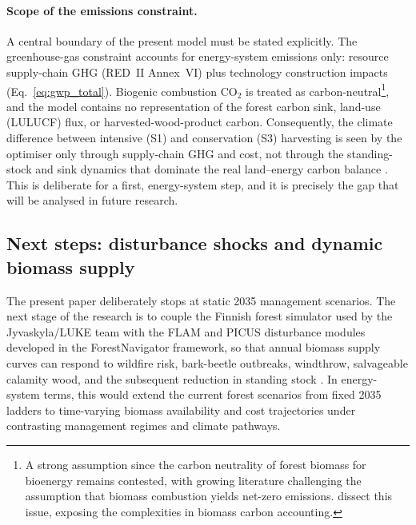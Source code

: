 \documentclass{article}
\begin{document}
\paragraph{Scope of the emissions constraint.}
A central boundary of the present model must be stated explicitly. The greenhouse-gas
constraint accounts for energy-system emissions only: resource supply-chain GHG
(RED~II Annex~VI) plus technology construction impacts (Eq.~\ref{eq:gwp_total}). Biogenic
combustion CO$_2$ is treated as carbon-neutral\footnote{A strong assumption since the carbon neutrality of forest biomass for bioenergy remains contested, with growing literature challenging the assumption that biomass combustion yields net-zero emissions. \cite{selivanovCarbonNeutralityForest2023,ahamerWhyBiomassFuels2022,ahamerHowComputeWhether2024,feiwuStrategicUsesAncillary2023,boothNotCarbonNeutral2018} dissect this issue, exposing the complexities in biomass carbon accounting.}, and the model contains no
representation of the forest carbon sink, land-use (LULUCF) flux, or harvested-wood-product
carbon. Consequently, the climate difference between intensive (S1) and conservation (S3)
harvesting is seen by the optimiser only through supply-chain GHG and cost, not through the
standing-stock and sink dynamics that dominate the real land--energy carbon balance
\citep{reckaRoleBiomassDecarbonisation2023}. This is deliberate for a first, energy-system
step, and it is precisely the gap that will be analysed in future research.


\subsection{Next steps: disturbance shocks and dynamic biomass supply}

The present paper deliberately stops at static 2035 management scenarios. The next stage of the research is to couple the Finnish forest simulator used by the Jyvaskyla/LUKE team with the FLAM and PICUS disturbance modules developed in the ForestNavigator framework, so that annual biomass supply curves can respond to wildfire risk, bark-beetle outbreaks, windthrow, salvageable calamity wood, and the subsequent reduction in standing stock \citep{venalainenClimateChangeInduces2020,hlasnyDevastatingOutbreakBark2021,tothImpactsCalamityLogging2020}. In energy-system terms, this would extend the current forest scenarios from fixed 2035 ladders to time-varying biomass availability and cost trajectories under contrasting management regimes and climate pathways.
\end{document}
